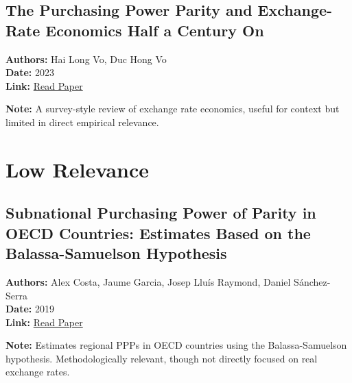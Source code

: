 \documentclass[
  11pt,
]{article}
\begin{document}
\subsection{The Purchasing Power Parity and Exchange-Rate Economics Half
a Century
On}\label{the-purchasing-power-parity-and-exchange-rate-economics-half-a-century-on}

\textbf{Authors:} Hai Long Vo, Duc Hong Vo\\
\textbf{Date:} 2023\\
\textbf{Link:}
\href{https://drive.google.com/file/d/1GvSoUtKJiy58EFfif0aoFeuvEYS26tqs/view?usp=sharing}{Read
Paper}

\textbf{Note:} A survey-style review of exchange rate economics, useful
for context but limited in direct empirical relevance.

\section{Low Relevance}\label{low-relevance}

\subsection{Subnational Purchasing Power of Parity in OECD Countries:
Estimates Based on the Balassa-Samuelson
Hypothesis}\label{subnational-purchasing-power-of-parity-in-oecd-countries-estimates-based-on-the-balassa-samuelson-hypothesis}

\textbf{Authors:} Alex Costa, Jaume Garcia, Josep Lluís Raymond, Daniel
Sánchez-Serra\\
\textbf{Date:} 2019\\
\textbf{Link:}
\href{https://drive.google.com/file/d/1QT0iR2TwIY5ayraL7pAe0Ir_R03U17nR/view?usp=sharing}{Read
Paper}

\textbf{Note:} Estimates regional PPPs in OECD countries using the
Balassa-Samuelson hypothesis. Methodologically relevant, though not
directly focused on real exchange rates.


\printbibliography
\end{document}
